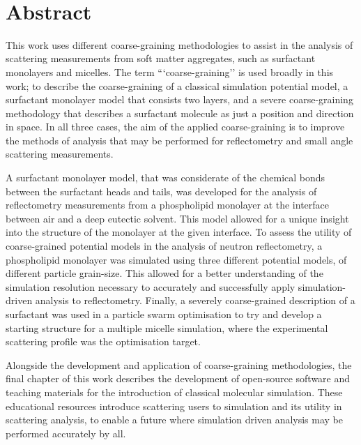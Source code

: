 \documentclass[twoside,symmetric,nobib]{./arm-thesis}
\newcommand{\blankpage}{\newpage\hbox{}\thispagestyle{empty}\newpage}
\begin{document}
\blankpage

\newpage

\begin{fullwidth}
\thispagestyle{empty}
\setlength{\parindent}{0pt}
\setlength{\parskip}{\baselineskip}
~\vfill
\chapter*{Abstract}
This work uses different coarse-graining methodologies to assist in the analysis of scattering measurements from soft matter aggregates, such as surfactant monolayers and micelles.
The term ```coarse-graining'' is used broadly in this work; to describe the coarse-graining of a classical simulation potential model, a surfactant monolayer model that consists two layers, and a severe coarse-graining methodology that describes a surfactant molecule as just a position and direction in space.
In all three cases, the aim of the applied coarse-graining is to improve the methods of analysis that may be performed for reflectometry and small angle scattering measurements.

A surfactant monolayer model, that was considerate of the chemical bonds between the surfactant heads and tails, was developed for the analysis of reflectometry measurements from a phospholipid monolayer at the interface between air and a deep eutectic solvent.
This model allowed for a unique insight into the structure of the monolayer at the given interface.
To assess the utility of coarse-grained potential models in the analysis of neutron reflectometry, a phospholipid monolayer was simulated using three different potential models, of different particle grain-size.
This allowed for a better understanding of the simulation resolution necessary to accurately and successfully apply simulation-driven analysis to reflectometry.
Finally, a severely coarse-grained description of a surfactant was used in a particle swarm optimisation to try and develop a starting structure for a multiple micelle simulation, where the experimental scattering profile was the optimisation target.

Alongside the development and application of coarse-graining methodologies, the final chapter of this work describes the development of open-source software and teaching materials for the introduction of classical molecular simulation.
These educational resources introduce scattering users to simulation and its utility in scattering analysis, to enable a future where simulation driven analysis may be performed accurately by all.
~\vfill
\end{fullwidth}
\end{document}
